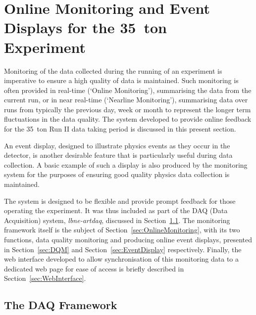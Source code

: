 
\graphicspath{{OnlineMonitoring/Figs/}}

\chapter{Online Monitoring and Event Displays for the 35~ton Experiment}\label{chap:OnlineMonitoring}

Monitoring of the data collected during the running of an experiment is imperative to ensure a high quality of data is maintained.  Such monitoring is often provided in real-time (`Online Monitoring'), summarising the data from the current run, or in near real-time (`Nearline Monitoring'), summarising data over runs from typically the previous day, week or month to represent the longer term fluctuations in the data quality.  The system developed to provide online feedback for the 35~ton Run II data taking period is discussed in this present section.

An event display, designed to illustrate physics events as they occur in the detector, is another desirable feature that is particularly useful during data collection.  A basic example of such a display is also produced by the monitoring system for the purposes of ensuring good quality physics data collection is maintained.

The system is designed to be flexible and provide prompt feedback for those operating the experiment.  It was thus included as part of the DAQ (Data Acquisition) system, \textit{lbne-artdaq}, discussed in Section~\ref{sec:lbne-artdaq}.  The monitoring framework itself is the subject of Section~\ref{sec:OnlineMonitoring}, with its two functions, data quality monitoring and producing online event displays, presented in Section~\ref{sec:DQM} and Section~\ref{sec:EventDisplay} respectively.  Finally, the web interface developed to allow synchronisation of this monitoring data to a dedicated web page for ease of access is briefly described in Section~\ref{sec:WebInterface}.

\section{The DAQ Framework}\label{sec:lbne-artdaq}

